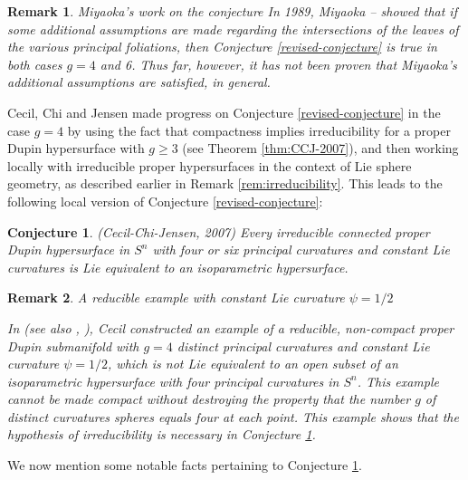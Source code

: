 \documentclass[12pt]{article}
\newtheorem{remark}{Remark}[section]
\newtheorem{conjecture}{Conjecture}[section]
\begin{document}
{\begin{remark}{Miyaoka's work on the conjecture}
\noindent
{\rm In 1989, Miyaoka \cite{Mi2}--\cite{Mi3} showed that if some additional assumptions are made regarding the intersections of the leaves of the various principal foliations, then Conjecture \ref{revised-conjecture}
is true in both cases
$g=4$ and 6.  
Thus far, however, it has not been proven that Miyaoka's additional assumptions are satisfied, in general.}
\end{remark}
 
Cecil, Chi and Jensen \cite{CCJ2} 
made progress on Conjecture \ref{revised-conjecture} in the case $g=4$ by using the
fact that compactness implies irreducibility for a proper Dupin hypersurface
with $g \geq 3$ (see Theorem \ref{thm:CCJ-2007}), 
and then working locally with irreducible proper hypersurfaces in the context 
of Lie sphere geometry, as described earlier in Remark \ref{rem:irreducibility}.  This leads to the following 
local version of Conjecture \ref{revised-conjecture}:


\begin{conjecture}
\label{revised-conjecture-local}
(Cecil-Chi-Jensen, 2007)
Every irreducible connected proper Dupin hypersurface in $S^n$ with four or six principal curvatures
and constant Lie curvatures is Lie equivalent to an isoparametric hypersurface.
\end{conjecture}


\begin{remark}{A reducible example with constant Lie curvature $\psi = 1/2$} 
\label{rem:reducible-with-lie curv-1/2}

\noindent
{\rm In \cite{CecKod} (see also \cite[pp. 80--82]{Cec9},  \cite[pp. 304--306]{CR8}),  Cecil constructed an example of
a reducible, non-compact proper Dupin submanifold with $g=4$ distinct principal 
curvatures and constant Lie curvature
$\psi = 1/2$, which is not Lie equivalent to an open subset of an isoparametric
hypersurface with four principal curvatures in $S^n$.  This example cannot be made compact without destroying the property that the number $g$ of distinct curvatures spheres equals four at each point. This example shows that the 
hypothesis of irreducibility is necessary in Conjecture \ref{revised-conjecture-local}.}
\end{remark}

We now mention some notable facts pertaining to Conjecture \ref{revised-conjecture-local}.\\

}
\end{document}
